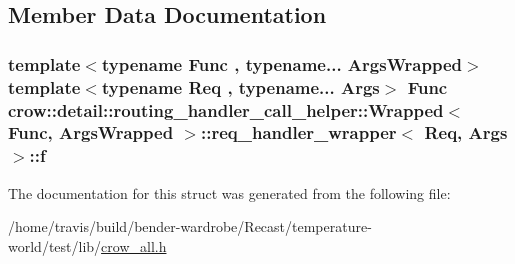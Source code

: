 \subsection{Member Data Documentation}
\hypertarget{structcrow_1_1detail_1_1routing__handler__call__helper_1_1_wrapped_1_1req__handler__wrapper_a0553c3d38f4902d9c3fa8655812ddbd7}{
\subsubsection[{f}]{\setlength{\rightskip}{0pt plus 5cm}template$<$typename Func , typename... Args\-Wrapped$>$ template$<$typename Req , typename... Args$>$ Func {\bf crow\-::detail\-::routing\-\_\-handler\-\_\-call\-\_\-helper\-::\-Wrapped}$<$ Func, Args\-Wrapped $>$\-::{\bf req\-\_\-handler\-\_\-wrapper}$<$ Req, Args $>$\-::f}}\label{structcrow_1_1detail_1_1routing__handler__call__helper_1_1_wrapped_1_1req__handler__wrapper_a0553c3d38f4902d9c3fa8655812ddbd7}


The documentation for this struct was generated from the following file\-:\begin{DoxyCompactItemize}
\item 
/home/travis/build/bender-\/wardrobe/\-Recast/temperature-\/world/test/lib/\hyperlink{crow__all_8h}{crow\-\_\-all.\-h}\end{DoxyCompactItemize}
